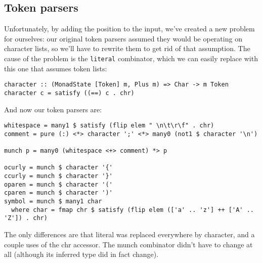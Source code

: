 \documentclass{tmr}
\begin{document}
\subsection{Token parsers}
Unfortunately, by adding the position to the input, we've created a new problem for ourselves: our 
original token parsers assumed they would be operating on character lists, so we'll have to rewrite
them to get rid of that assumption.  The cause of the problem is the \verb+literal+ combinator, which
we can easily replace with this one that assumes token lists:
\begin{verbatim}
character :: (MonadState [Token] m, Plus m) => Char -> m Token
character c = satisfy ((==) c . chr)
\end{verbatim}
And now our token parsers are:
\begin{verbatim}
whitespace = many1 $ satisfy (flip elem " \n\t\r\f" . chr)
comment = pure (:) <*> character ';' <*> many0 (not1 $ character '\n')

munch p = many0 (whitespace <+> comment) *> p

ocurly = munch $ character '{'
ccurly = munch $ character '}'
oparen = munch $ character '('
cparen = munch $ character ')'
symbol = munch $ many1 char
  where char = fmap chr $ satisfy (flip elem (['a' .. 'z'] ++ ['A' .. 'Z']) . chr)
\end{verbatim}
The only differences are that literal was replaced everywhere by character, and a couple uses
of the chr accessor.  The munch combinator didn't have to change at all (although its inferred
type did in fact change).
\end{document}
